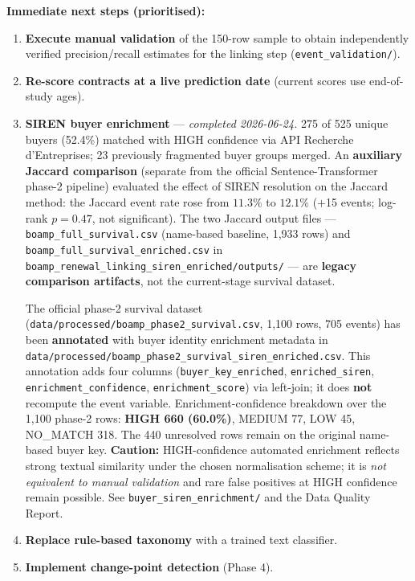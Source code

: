 \documentclass[11pt,a4paper]{article}
\begin{document}
\textbf{Immediate next steps (prioritised):}
\begin{enumerate}[leftmargin=1.4em,itemsep=2pt]
  \item \textbf{Execute manual validation} of the 150-row sample to obtain
        independently verified precision/recall estimates for the linking step
        (\nolinkurl{event_validation/}).
  \item \textbf{Re-score contracts at a live prediction date} (current scores
        use end-of-study ages).
  \item \textbf{SIREN buyer enrichment} --- \textit{completed 2026-06-24.}
        275 of 525 unique buyers (52.4\%) matched with HIGH confidence via
        API Recherche d'Entreprises; 23 previously fragmented buyer groups merged.
        An \textbf{auxiliary Jaccard comparison} (separate from the official
        Sentence-Transformer phase-2 pipeline) evaluated the effect of SIREN
        resolution on the Jaccard method: the Jaccard event rate rose from
        $11.3\%$ to $12.1\%$ ($+$15 events; log-rank $p = 0.47$, not significant).
        The two Jaccard output files ---
        \nolinkurl{boamp_full_survival.csv} (name-based baseline, 1,933 rows) and
        \nolinkurl{boamp_full_survival_enriched.csv} in
        \nolinkurl{boamp_renewal_linking_siren_enriched/outputs/} ---
        are \textbf{legacy comparison artifacts}, not the current-stage survival
        dataset.

        The official phase-2 survival dataset
        (\nolinkurl{data/processed/boamp_phase2_survival.csv}, 1,100 rows,
        705 events) has been \textbf{annotated} with buyer identity enrichment
        metadata in
        \nolinkurl{data/processed/boamp_phase2_survival_siren_enriched.csv}.
        This annotation adds four columns (\nolinkurl{buyer_key_enriched},
        \nolinkurl{enriched_siren}, \nolinkurl{enrichment_confidence},
        \nolinkurl{enrichment_score}) via left-join; it does \textbf{not}
        recompute the event variable.
        Enrichment-confidence breakdown over the 1,100 phase-2 rows:
        \textbf{HIGH 660 (60.0\%)}, MEDIUM 77, LOW 45, NO\_MATCH 318.
        The 440 unresolved rows remain on the original name-based buyer key.
        \textbf{Caution:} HIGH-confidence automated enrichment reflects strong
        textual similarity under the chosen normalisation scheme; it is
        \emph{not equivalent to manual validation} and rare false positives at
        HIGH confidence remain possible.
        See \nolinkurl{buyer_siren_enrichment/} and the Data Quality Report.
  \item \textbf{Replace rule-based taxonomy} with a trained text classifier.
  \item \textbf{Implement change-point detection} (Phase 4).
\end{enumerate}
\end{document}
